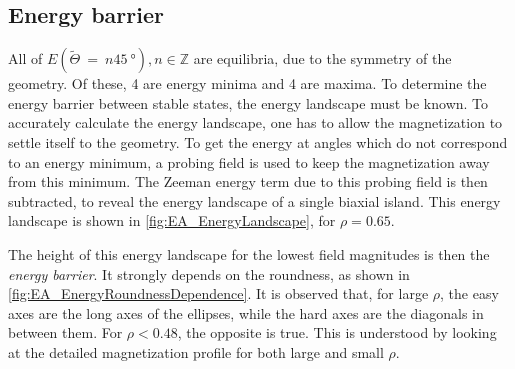 \documentclass[twocolumn]{phdsymp}
\begin{document}
\subsection{Energy barrier}
All of $E(\widetilde{\Theta}~=~n\SI{45}{\degree}), n\in\mathbb{Z}$ are equilibria, due to the symmetry of the geometry. Of these, 4 are energy minima and 4 are maxima. To determine the energy barrier between stable states, the energy landscape must be known. To accurately calculate the energy landscape, one has to allow the magnetization to settle itself to the geometry. To get the energy at angles which do not correspond to an energy minimum, a probing field is used to keep the magnetization away from this minimum. The Zeeman energy term due to this probing field is then subtracted, to reveal the energy landscape of a single biaxial island. This energy landscape is shown in \cref{fig:EA_EnergyLandscape}, for $\rho=0.65$. \par
The height of this energy landscape for the lowest field magnitudes is then the \textit{energy barrier}. It strongly depends on the roundness, as shown in \cref{fig:EA_EnergyRoundnessDependence}. It is observed that, for large $\rho$, the easy axes are the long axes of the ellipses, while the hard axes are the diagonals in between them. For $\rho < 0.48$, the opposite is true. This is understood by looking at the detailed magnetization profile for both large and small $\rho$.
\end{document}
